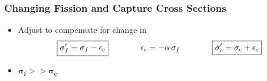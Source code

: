 \begin{frame}
\frametitle{Changing Fission and Capture Cross Sections}
\begin{itemize}
  \item Adjust  to compensate for change in 
	\begin{equation*}
	\begin{array}{ccc}
	\boxed{\sigma'_f = \sigma_f - \epsilon_c}\hspace{0.4in} &  \epsilon_c = {\colb{-}}\alpha\,\sigma_f &\hspace{0.4in} \boxed{\sigma'_c = \sigma_c + \epsilon_c}%
	\end{array}
	\end{equation*}
\end{itemize} 

\begin{table}[h!] 
	\vspace{-0.1in}
  \begin{center}
  \end{center}
\end{table}
\pause
\begin{itemize}
  \item $\mathbf{\sigma_f >> \sigma_c}$ 

\end{itemize} 
\end{frame} 



